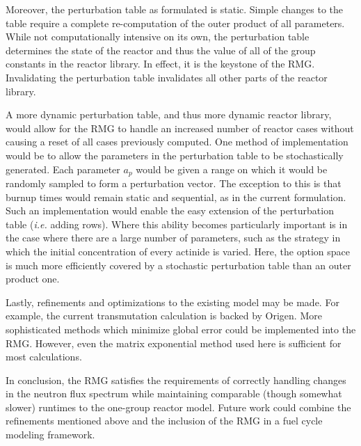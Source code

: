Moreover, the perturbation table as formulated is static.  Simple changes to the table
require a complete re-computation of the outer product of all parameters.  While not computationally
intensive on its own, the perturbation table determines the state of the reactor and thus the 
value of all of the group constants in the reactor library.  In effect, it is the keystone of the RMG. 
Invalidating the perturbation table invalidates all other parts of the reactor library.  

A more dynamic perturbation table, and thus more dynamic reactor library, would allow for the RMG to 
handle an increased number of reactor cases without causing a reset of all cases previously computed.
One method of implementation would be to allow the parameters in the perturbation table to be stochastically
generated.  Each parameter $a_p$ would be given a range on which it would be randomly sampled to form a 
perturbation vector.  The exception to this is that burnup times would remain static and sequential, as
in the current formulation.  Such an implementation would enable the easy extension of the perturbation 
table (\emph{i.e.} adding rows).  Where this ability becomes particularly important is in the case 
where there are a large number of parameters, such as the strategy in which the initial concentration of 
every actinide is varied.  Here, the option space is much more efficiently covered by a stochastic 
perturbation table than an outer product one.

Lastly, refinements and optimizations to the existing model may be made.  For example, the current 
transmutation calculation is backed by Origen.  More sophisticated methods which minimize global error 
could be implemented into the RMG.  However, even the matrix exponential method used here is 
sufficient for most calculations.

In conclusion, the RMG satisfies the requirements of correctly handling changes in the neutron flux 
spectrum while maintaining comparable (though somewhat slower) runtimes to the one-group reactor model.
Future work could combine the refinements mentioned above and the inclusion of the RMG in a fuel cycle 
modeling framework.
